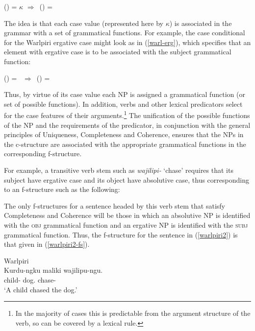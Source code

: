 \documentclass[output=paper,hidelinks]{langscibook}
\begin{document}
\ea \label{case-conditional}
 (\DOWN\CASE) = $\kappa$ $\Rightarrow$\ (\UP\GF) = \DOWN
 \z

The idea is that each case value (represented here by $\kappa$) is associated in the grammar with a set of grammatical functions.  For example, the case conditional for the Warlpiri ergative case might look as in (\ref{warl-erg}), which specifies that an element with ergative case is to be associated with the subject grammatical function:

\ea \label{warl-erg}
(\DOWN\CASE) = \ERG\ $\Rightarrow$\ (\UP\SUBJ) = \DOWN
\z

Thus, by virtue of its case value each NP is assigned a grammatical function (or set of possible functions).  In addition, verbs and other lexical predicators select for the case features of their arguments.\footnote{In the majority of cases this is predictable from the argument structure of the verb, so can be covered by a lexical rule.}  The unification of the possible functions of the NP and the requirements of the predicator, in conjunction with the general principles of Uniqueness, Completeness and Coherence, ensures that the NPs in the c-structure are associated with the appropriate grammatical functions in the corresponding f-structure.

For example, a transitive verb stem such as {\it wajilipi-} `chase' requires that its subject have ergative case and its object have absolutive case, thus corresponding to an f-structure such as the following:


The only f-structures for a sentence headed by this verb stem that satisfy Completeness and Coherence will be those in which an absolutive NP is identified with the \textsc{obj} grammatical function and an ergative NP is identified with the \textsc{subj} grammatical function. Thus, the f-structure for the sentence in (\ref{warlpiri2}) is that given in (\ref{warlpiri2-fs}). 

\ea
\ea\label{warlpiri2} Warlpiri\\
\gll Kurdu-ngku maliki wajilipu-ngu. \\
 {child-\ERG} {dog.\ABS} {chase-\PST}\\
 \glt `A child chased the dog.'
\ex\label{warlpiri2-fs}
\z\z
\end{document}
